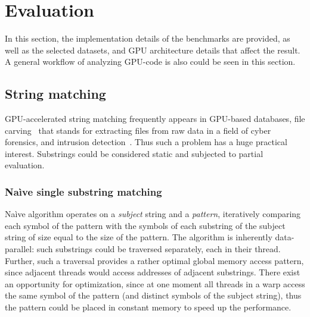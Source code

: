 \section{Evaluation}
In this section, the implementation details of the benchmarks are provided, 
as well as the selected datasets, and GPU architecture details that affect 
the result. A general workflow of analyzing GPU-code is also could be seen 
in this section. 

\subsection{String matching}
GPU-accelerated string matching frequently appears in GPU-based data\-bases, 
file carving~\cite{DataCarving,GPU-carving} that stands for extracting 
files from raw data in a field of cyber forensics, and intrusion 
detection~\cite{GPU-IDS}. Thus such a problem has a huge practical 
interest. Substrings could be considered static and subjected to 
partial evaluation.

\subsubsection{Na\`ive single substring matching}\label{naive-single}
Na\`ive algorithm operates on a \emph{subject} string and a \emph{pattern}, 
iteratively comparing each symbol of the pattern with the 
symbols of each substring of the subject string of size equal to the size 
of the pattern. The algorithm is inherently data-parallel: such substrings 
could be traversed separately, each in their thread. Further, such a traversal 
provides a rather optimal global memory access pattern, since adjacent 
threads would access addresses of adjacent substrings. There exist an opportunity 
for optimization, since at one moment all threads in a warp access the same symbol 
of the pattern (and distinct symbols of the subject string), thus the pattern could 
be placed in constant memory to speed up the performance.

 
